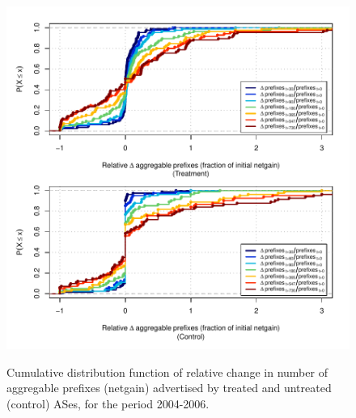 \clearpage
\vspace*{16pt}
\begin{figure}[H]
\begin{centering}
\begin{singlespace}
\captionsetup{list=no}
    \includegraphics[width=6in]{figures/behavior-rel_netgain-2004_2006-corr.pdf}
    \vspace{-2em}\\
    \caption{Cumulative distribution function of relative change in number of
    aggregable prefixes (netgain) advertised by treated and untreated (control)
    ASes, for the period 2004-2006.}
\end{singlespace}
\end{centering}
\end{figure}

